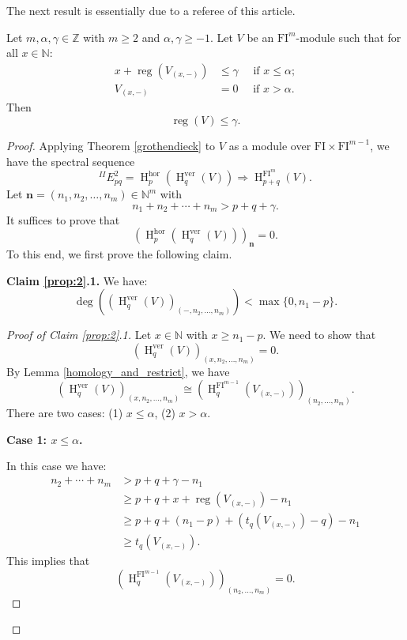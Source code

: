 \documentclass{amsart}
\numberwithin{equation}{section}
\DeclareMathOperator{\reg}{reg}
\DeclareMathOperator{\HH}{H}
\newcommand{\N}{{\mathbb{N}}}
\newcommand{\hor}{{\mathrm{hor}}}
\newcommand{\ver}{{\mathrm{ver}}}
\newcommand{\FI}{{\mathrm{FI}}}
\begin{document}
The next result is essentially due to a referee of this article.


\begin{proposition} \label{prop:2}
   Let $m, \alpha, \gamma \in \mathbb{Z}$ with $m\geqslant 2$ and $\alpha, \gamma \geqslant -1$. Let $V$ be an $\FI^m$-module such that for all $x\in \N$:
   \begin{align*}
      x + \reg\left(V_{(x, -)}\right) &\leqslant \gamma \quad \mbox{ if } x\leqslant \alpha;\\
      V_{(x, -)} &= 0 \quad \mbox{ if } x > \alpha. 
   \end{align*}
   Then 
   \[ \reg(V) \leqslant \gamma. \]
\end{proposition}

\begin{proof}
   Applying Theorem \ref{grothendieck} to $V$ as a module over $\FI\times \FI^{m-1}$, we have the spectral sequence
   \[  ^{II}\!E^2_{pq} = \HH^\hor_p (\HH^\ver_q (V)) \Rightarrow \HH^{\FI^m}_{p+q}(V).  \]
   Let $\mathbf{n}=(n_1, n_2, \ldots, n_m) \in \N^m$ with 
   \[ n_1 + n_2 + \cdots + n_m > p+q+\gamma. \]
   It suffices to prove that 
   \[ (\HH^\hor_p (\HH^\ver_q (V)))_{\mathbf{n}} = 0. \]
   To this end, we first prove the following claim.
   
   \medskip 
   
   {\bf Claim \ref{prop:2}.1.} We have:
   \[ \deg\left( (\HH^\ver_q(V))_{(-, n_2, \ldots, n_m)} \right) < \max\{0, n_1-p\}. \]
   
   \begin{proof}[Proof of Claim \ref{prop:2}.1]
      Let $x\in \N$ with $x\geqslant n_1-p$. We need to show that 
      \[ (\HH^\ver_q(V))_{(x, n_2, \ldots, n_m)} = 0. \] 
      By Lemma \ref{homology_and_restrict}, we have
      \[ (\HH^\ver_q(V))_{(x, n_2, \ldots, n_m)} \cong (\HH^{\FI^{m-1}}_q(V_{(x, -)}))_{(n_2, \ldots, n_m)}. \]
      There are two cases: (1) $x\leqslant \alpha$, (2) $x>\alpha$.

      \medskip 


      {\bf Case 1: $x\leqslant \alpha$.}

      In this case we have:
      \begin{align*}
         n_2 + \cdots + n_m &> p+q+\gamma-n_1  \\
         &\geqslant p+q+x+  \reg\left(V_{(x, -)}\right) -n_1  \\
         &\geqslant p+q+(n_1-p) + \left(t_q\left(V_{(x,-)}\right) - q\right)-n_1 \\
         &\geqslant t_q\left(V_{(x,-)}\right).
      \end{align*}
      This implies that 
      \[ (\HH^{\FI^{m-1}}_q(V_{(x, -)}))_{(n_2, \ldots, n_m)} = 0. \]


\end{proof}
\end{proof}
\end{document}
